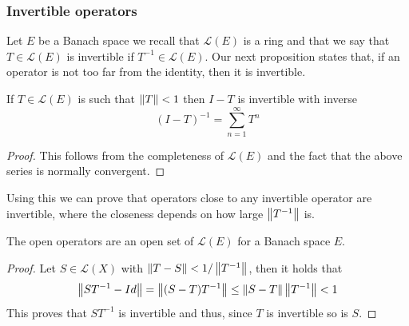 \documentclass[
    a4paper,
    DIV=14,
    abstract=true,
    numbers=noenddot
]{scrartcl}
\begin{document}
\subsubsection{Invertible operators}
Let $E$ be a Banach space we recall that $\mathcal{L}(E)$ is a ring and that we say that $T\in\mathcal{L}(E)$ is invertible if $T^{-1}\in\mathcal{L}(E)$. Our next proposition states that, if an operator is not too far from the identity, then it is invertible.
\begin{proposition}
	If $T\in\mathcal{L}(E)$ is such that $\left\lVert T \right\rVert<1$ then $I-T$ is invertible with inverse
	\begin{equation*}
		(I-T)^{-1}=\sum_{n=1}^\infty T^n
	\end{equation*}
	\begin{proof}
		This follows from the completeness of $\mathcal{L}(E)$ and the fact that the above series is normally convergent.
	\end{proof}
\end{proposition}
Using this we can prove that operators close to any invertible operator are invertible, where the closeness depends on how large $\left\lVert T^{-1} \right\rVert$ is.
\begin{corollary}
	The open operators are an open set of $\mathcal{L}(E)$ for a Banach space $E$.
\end{corollary}
\begin{proof}
	Let $S\in\mathcal{L}(X)$  with $\left\lVert T-S \right\rVert<1/\left\lVert T^{-1} \right\rVert$, then it holds that
	\begin{equation*}
		\left\lVert ST^{-1}-Id \right\rVert=\left\lVert (S-T)T^{-1} \right\rVert\leq\left\lVert S-T \right\rVert\left\lVert T^{-1} \right\rVert<1
	\end{equation*}
	This proves that $ST^{-1}$ is invertible and thus, since $T$ is invertible so is $S$.
\end{proof}
\end{document}
